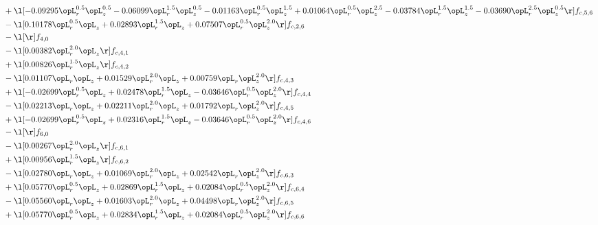 \begin{alignat}{2}
& + \l[  -0.09295 \opL_r^{0.5} \opL_z^{0.5}   -0.06099 \opL_r^{1.5} \opL_z^{0.5}   -0.01163 \opL_r^{0.5} \opL_z^{1.5} +  0.01064 \opL_r^{0.5} \opL_z^{2.5}   -0.03784 \opL_r^{1.5} \opL_z^{1.5}   -0.03690 \opL_r^{2.5} \opL_z^{0.5}  \r] f_{c,5,6} \nonumber \\ 
& - \l[  0.10178 \opL_r^{0.5} \opL_z +  0.02893 \opL_r^{1.5} \opL_z +  0.07507 \opL_r^{0.5} \opL_z^{2.0}  \r] f_{c,2,6} \nonumber \\ 
& - \l[  \r] f_{4,0} \nonumber \\ 
& - \l[  0.00382 \opL_r^{2.0} \opL_z  \r] f_{c,4,1} \nonumber \\ 
& + \l[  0.00826 \opL_r^{1.5} \opL_z  \r] f_{c,4,2} \nonumber \\ 
& - \l[  0.01107 \opL_r \opL_z +  0.01529 \opL_r^{2.0} \opL_z +  0.00759 \opL_r \opL_z^{2.0}  \r] f_{c,4,3} \nonumber \\ 
& + \l[  -0.02699 \opL_r^{0.5} \opL_z +  0.02478 \opL_r^{1.5} \opL_z   -0.03646 \opL_r^{0.5} \opL_z^{2.0}  \r] f_{c,4,4} \nonumber \\ 
& - \l[  0.02213 \opL_r \opL_z +  0.02211 \opL_r^{2.0} \opL_z +  0.01792 \opL_r \opL_z^{2.0}  \r] f_{c,4,5} \nonumber \\ 
& + \l[  -0.02699 \opL_r^{0.5} \opL_z +  0.02316 \opL_r^{1.5} \opL_z   -0.03646 \opL_r^{0.5} \opL_z^{2.0}  \r] f_{c,4,6} \nonumber \\ 
& - \l[  \r] f_{6,0} \nonumber \\ 
& - \l[  0.00267 \opL_r^{2.0} \opL_z  \r] f_{c,6,1} \nonumber \\ 
& + \l[  0.00956 \opL_r^{1.5} \opL_z  \r] f_{c,6,2} \nonumber \\ 
& - \l[  0.02780 \opL_r \opL_z +  0.01069 \opL_r^{2.0} \opL_z +  0.02542 \opL_r \opL_z^{2.0}  \r] f_{c,6,3} \nonumber \\ 
& + \l[  0.05770 \opL_r^{0.5} \opL_z +  0.02869 \opL_r^{1.5} \opL_z +  0.02084 \opL_r^{0.5} \opL_z^{2.0}  \r] f_{c,6,4} \nonumber \\ 
& - \l[  0.05560 \opL_r \opL_z +  0.01603 \opL_r^{2.0} \opL_z +  0.04498 \opL_r \opL_z^{2.0}  \r] f_{c,6,5} \nonumber \\ 
& + \l[  0.05770 \opL_r^{0.5} \opL_z +  0.02834 \opL_r^{1.5} \opL_z +  0.02084 \opL_r^{0.5} \opL_z^{2.0}  \r] f_{c,6,6} \nonumber \\ 
\end{alignat} 


